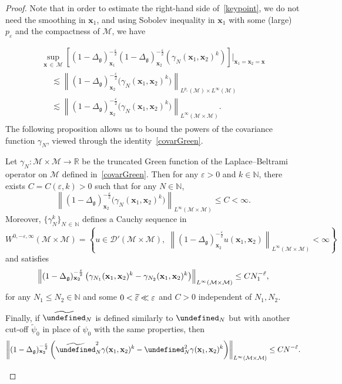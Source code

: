 \documentclass[10pt]{amsart}
\theoremstyle{definition}\newtheorem{defi}[theo]{Definition}\newtheorem{rema}[theo]{Remark}\newtheorem{exam}[theo]{Example}\newtheorem{exem}[theo]{Example}\newtheorem{nota}[theo]{Notation}
\newcommand{\R}{\mathbb{R}}
\newcommand{\N}{\mathbb{N}}
\let\P= \undefined
\newcommand{\P}{\mathbf{P}}
\newcommand{\x}{\mathbf{x}}
\newcommand{\Dp}{\mathcal{D}'}
\newcommand{\M}{\mathcal{M}}
\newcommand{\g}{\mathfrak{g}}
\newcommand{\Dlg}{\Delta_{\g}}
\newcommand{\eps}{\varepsilon}
\newcommand{\wt}{\widetilde}
\newcommand{\les}{\lesssim}
\let\oldtilde\tilde
\renewcommand*{\tilde}[1]{\mathchoice{\widetilde{#1}}{\widetilde{#1}}{\oldtilde{#1}}{\oldtilde{#1}}}
\begin{document}
\begin{proof}
Note that in order to estimate the right-hand side of~\eqref{keypoint}, we do not need the smoothing in $\x_1$, and using Sobolev inequality in $\x_1$ with some (large) $p_{\eps}$ and the compactness of $\M$, we have

\begin{multline}\label{rk-gamma}
\sup_{\x\,\in\,\M}\left[(1-\Dlg)_{\x_1}^{-\frac\eps2}(1-\Dlg)_{\x_2}^{-\frac\eps2}\left(\gamma_N(\x_1,\x_2)^k\right)\right]\Big|_{\x_1=\x_2=\x}\\
\begin{aligned}
& \les \left\|(1-\Dlg)_{\x_2}^{-\frac\eps2}\big(\gamma_N(\x_1,\x_2)^k\big)\right\|_{L^{p_\eps}(\M)\times L^{\infty}(\M)}
\\
&\les \left\|(1-\Dlg)_{\x_2}^{-\frac\eps2}\big(\gamma_N(\x_1,\x_2)^k\big)\right\|_{L^{\infty}(\M\times\M)}.
\end{aligned}
\end{multline}
The following proposition allows us to bound the powers of the covariance function $\gamma_N$, viewed through the identity~\eqref{covarGreen}.

\begin{prop}\label{prop-Green}
Let $\gamma_N: \M\times\M\rightarrow\R$ be the truncated Green function of the Laplace--Beltrami operator on $\M$ defined in~\eqref{covarGreen}. Then for any $\eps>0$ and $k\in\N$, there exists $C=C(\eps,k)>0$ such that for any $N\in\N$,
\begin{equation}\label{estim-Green}
\left\|(1-\Dlg)_{\x_2}^{-\frac\eps2}\big(\gamma_N(\x_1,\x_2)^k\big)\right\|_{L^{\infty}(\M\times\M)} \leq C<\infty.
\end{equation}
Moreover, $\{\gamma_N^k\}_{N\,\in\,\N}$ defines a Cauchy sequence in
\begin{equation*}
W^{0,-\eps,\infty}(\M\times\M)=\left\{u\in\Dp(\M\times\M),\;\left\|(1-\Dlg)_{\x_2}^{-\frac\eps2}u(\x_1,\x_2)\right\|_{L^{\infty}(\M\times\M)}<\infty\right\}
\end{equation*}
and satisfies
\begin{equation}\label{estim-Green-diff}
\left\|(1-\Dlg)_{\x_2}^{-\frac\eps2}\left(\gamma_{N_1}(\x_1,\x_2)^k-\gamma_{N_2}(\x_1,\x_2)^k\right)\right\|_{L^{\infty}(\M\times\M)} \leq CN_1^{-\tilde{\eps}},
\end{equation}
for any $N_1\leq N_2\in\N$ and some $0<\tilde{\eps}\ll\eps$ and $C>0$ independent of $N_1,N_2$.

Finally, if $\wt\P_N$ is defined similarly to $\P_N$ but with another cut-off $\wt\psi_0$ in place of $\psi_0$ with the same properties, then
\begin{equation}\label{estim-Green-diff2}
\left\|(1-\Dlg)_{\x_2}^{-\frac\eps2}\left(\wt\P_N^2\gamma(\x_1,\x_2)^k-\P_N^2\gamma(\x_1,\x_2)^k\right)\right\|_{L^{\infty}(\M\times\M)} \leq CN^{-\tilde{\eps}}.
\end{equation}
\end{prop}


\end{proof}
\end{document}

